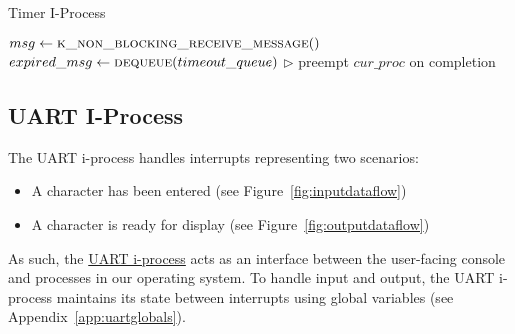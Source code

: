 \documentclass[12pt]{report}
\begin{document}
\begin{algorithm}
\caption{Timer I-Process}
\label{alg:timeriprocess}
\begin{algorithmic}[1]
    \State $msg \leftarrow \Call{k\_non\_blocking\_receive\_message}{\null}$
    \State {}
        \State $expired\_msg \leftarrow \Call{dequeue}{timeout\_queue}$
        \State {} 
            \State $\triangleright$ preempt $cur\_proc$ on completion
        \EndIf
    \EndWhile
\EndProcedure
\end{algorithmic}
\end{algorithm}

\subsection{UART I-Process}
\label{subsec:UART I-Process}

The UART i-process handles interrupts representing two scenarios:

\begin{itemize}

\item A character has been entered (see Figure~\ref{fig:inputdataflow})
\item A character is ready for display (see Figure~\ref{fig:outputdataflow})

\end{itemize}

As such, the \hyperref[alg:uartiprocess]{UART i-process} acts as an interface between the user-facing console and processes in our operating system. To handle input and output, the UART i-process maintains its state between interrupts using global variables (see Appendix~\ref{app:uartglobals}).
\end{document}
